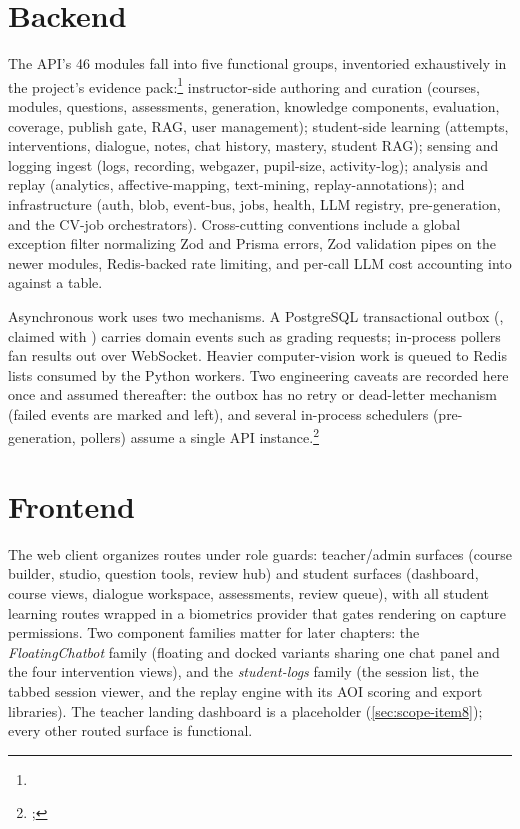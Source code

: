 \section{Backend}
\label{sec:arch-backend}

The API's 46 modules fall into five functional groups, inventoried
exhaustively in the project's evidence
pack:\footnote{}
instructor-side authoring and curation (courses, modules, questions,
assessments, generation, knowledge components, evaluation, coverage,
publish gate, RAG, user management); student-side learning (attempts,
interventions, dialogue, notes, chat history, mastery, student RAG);
sensing and logging ingest (logs, recording, webgazer, pupil-size,
activity-log); analysis and replay (analytics, affective-mapping,
text-mining, replay-annotations); and infrastructure (auth, blob,
event-bus, jobs, health, LLM registry, pre-generation, and the CV-job
orchestrators). Cross-cutting conventions include a global exception
filter normalizing Zod and Prisma errors, Zod validation pipes on the
newer modules, Redis-backed rate limiting, and per-call LLM cost
accounting into  against a
 table.

Asynchronous work uses two mechanisms. A PostgreSQL transactional outbox
(, claimed with ) carries
domain events such as grading requests; in-process pollers fan results
out over WebSocket. Heavier computer-vision work is queued to Redis lists
consumed by the Python workers. Two engineering caveats are recorded here
once and assumed thereafter: the outbox has no retry or dead-letter
mechanism (failed events are marked and left), and several in-process
schedulers (pre-generation, pollers) assume a single API
instance.\footnote{;
}

\section{Frontend}
\label{sec:arch-frontend}

The web client organizes routes under role guards: teacher/admin surfaces
(course builder, studio, question tools, review hub) and student surfaces
(dashboard, course views, dialogue workspace, assessments, review queue),
with all student learning routes wrapped in a biometrics provider that
gates rendering on capture permissions. Two component families matter for
later chapters: the \emph{FloatingChatbot} family (floating and docked
variants sharing one chat panel and the four intervention views), and the
\emph{student-logs} family (the session list, the tabbed session viewer,
and the replay engine with its AOI scoring and export libraries). The
teacher landing dashboard is a placeholder (\cref{sec:scope-item8});
every other routed surface is functional.

